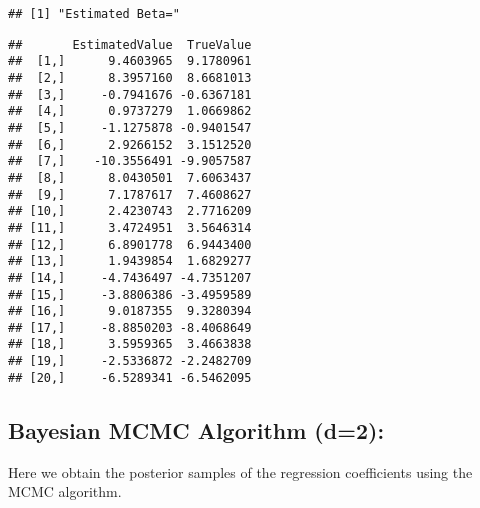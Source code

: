 \documentclass[
]{article}
\newenvironment{Shaded}{\begin{snugshade}}{\end{snugshade}}
\newcommand{\AttributeTok}[1]{\textcolor[rgb]{0.13,0.29,0.53}{#1}}
\newcommand{\CommentTok}[1]{\textcolor[rgb]{0.56,0.35,0.01}{\textit{#1}}}
\newcommand{\ConstantTok}[1]{\textcolor[rgb]{0.56,0.35,0.01}{#1}}
\newcommand{\DecValTok}[1]{\textcolor[rgb]{0.00,0.00,0.81}{#1}}
\newcommand{\FunctionTok}[1]{\textcolor[rgb]{0.13,0.29,0.53}{\textbf{#1}}}
\newcommand{\NormalTok}[1]{#1}
\newcommand{\OtherTok}[1]{\textcolor[rgb]{0.56,0.35,0.01}{#1}}
\newcommand{\SpecialCharTok}[1]{\textcolor[rgb]{0.81,0.36,0.00}{\textbf{#1}}}
\begin{document}
\begin{verbatim}
## [1] "Estimated Beta="
\end{verbatim}

\begin{Shaded}
\end{Shaded}

\begin{verbatim}
##       EstimatedValue  TrueValue
##  [1,]      9.4603965  9.1780961
##  [2,]      8.3957160  8.6681013
##  [3,]     -0.7941676 -0.6367181
##  [4,]      0.9737279  1.0669862
##  [5,]     -1.1275878 -0.9401547
##  [6,]      2.9266152  3.1512520
##  [7,]    -10.3556491 -9.9057587
##  [8,]      8.0430501  7.6063437
##  [9,]      7.1787617  7.4608627
## [10,]      2.4230743  2.7716209
## [11,]      3.4724951  3.5646314
## [12,]      6.8901778  6.9443400
## [13,]      1.9439854  1.6829277
## [14,]     -4.7436497 -4.7351207
## [15,]     -3.8806386 -3.4959589
## [16,]      9.0187355  9.3280394
## [17,]     -8.8850203 -8.4068649
## [18,]      3.5959365  3.4663838
## [19,]     -2.5336872 -2.2482709
## [20,]     -6.5289341 -6.5462095
\end{verbatim}

\hypertarget{bayesian-mcmc-algorithm-d2}{%
\subsection{Bayesian MCMC Algorithm
(d=2):}\label{bayesian-mcmc-algorithm-d2}}

Here we obtain the posterior samples of the regression coefficients
using the MCMC algorithm.

\begin{Shaded}
\end{Shaded}
\end{document}
